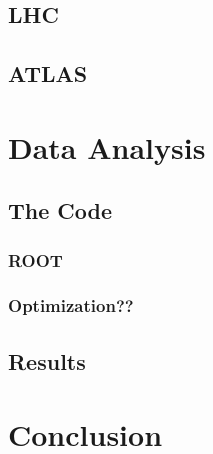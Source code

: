 \documentclass[11pt,a4paper]{article}
\begin{document}
\subsection{LHC}

\subsection{ATLAS}

\section{Data Analysis}

\subsection{The Code}

\subsubsection{ROOT}

\subsubsection{Optimization??}

\subsection{Results}

\section{Conclusion}

\printbibliography
\end{document}
